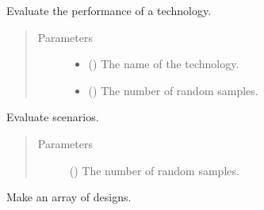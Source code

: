\documentclass[letterpaper,10pt,english]{sphinxmanual}
\begin{document}
\begin{fulllineitems}
\begin{fulllineitems}
\label{\detokenize{tyche:tyche.Designs.Designs.evaluate}}
Evaluate the performance of a technology.
\begin{quote}\begin{description}
\item[{Parameters}] \leavevmode\begin{itemize}
\item {} 
 () \textendash{} The name of the technology.

\item {} 
 () \textendash{} The number of random samples.

\end{itemize}

\end{description}\end{quote}

\end{fulllineitems}


\begin{fulllineitems}
\label{\detokenize{tyche:tyche.Designs.Designs.evaluate_scenarios}}
Evaluate scenarios.
\begin{quote}\begin{description}
\item[{Parameters}] \leavevmode
{} () \textendash{} The number of random samples.

\end{description}\end{quote}

\end{fulllineitems}


\begin{fulllineitems}
\label{\detokenize{tyche:tyche.Designs.Designs.vectorize_designs}}
Make an array of designs.


\end{fulllineitems}
\end{fulllineitems}
\end{document}
